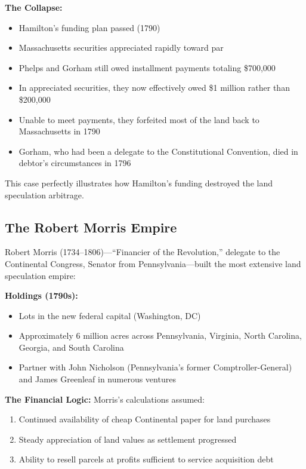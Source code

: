 \documentclass[12pt]{article}
\begin{document}
\textbf{The Collapse:}
\begin{itemize}
\item Hamilton's funding plan passed (1790)
\item Massachusetts securities appreciated rapidly toward par
\item Phelps and Gorham still owed installment payments totaling \$700,000
\item In appreciated securities, they now effectively owed \$1 million rather than \$200,000
\item Unable to meet payments, they forfeited most of the land back to Massachusetts in 1790
\item Gorham, who had been a delegate to the Constitutional Convention, died in debtor's circumstances in 1796
\end{itemize}

This case perfectly illustrates how Hamilton's funding destroyed the land speculation arbitrage.

\subsection{The Robert Morris Empire}

Robert Morris (1734--1806)---``Financier of the Revolution,'' delegate to the Continental Congress, Senator from Pennsylvania---built the most extensive land speculation empire:

\textbf{Holdings (1790s):}
\begin{itemize}
\item Lots in the new federal capital (Washington, DC)
\item Approximately 6 million acres across Pennsylvania, Virginia, North Carolina, Georgia, and South Carolina
\item Partner with John Nicholson (Pennsylvania's former Comptroller-General) and James Greenleaf in numerous ventures
\end{itemize}

\textbf{The Financial Logic:}
Morris's calculations assumed:
\begin{enumerate}
\item Continued availability of cheap Continental paper for land purchases
\item Steady appreciation of land values as settlement progressed
\item Ability to resell parcels at profits sufficient to service acquisition debt
\end{enumerate}
\end{document}
